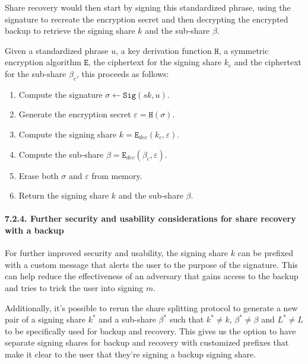 \documentclass[
]{article}
\providecommand{\tightlist}{%
  \setlength{\itemsep}{0pt}\setlength{\parskip}{0pt}}
\begin{document}
Share recovery would then start by signing this standardized phrase,
using the signature to recreate the encryption secret and then
decrypting the encrypted backup to retrieve the signing share \(k\) and
the sub-share \(\beta\).

Given a standardized phrase \(u\), a key derivation function
\(\mathtt{H}\), a symmetric encryption algorithm \(\mathtt{E}\), the
ciphertext for the signing share \(k_c\) and the ciphertext for the
sub-share \(\beta _c\), this proceeds as follows:

\begin{enumerate}
\def\labelenumi{\arabic{enumi}.}
\tightlist
\item
  Compute the signature \(\sigma \leftarrow \mathtt{Sig}(sk, u)\).
\item
  Generate the encryption secret \(\varepsilon = \mathtt{H}(\sigma)\).
\item
  Compute the signing share \(k = \mathtt{E} _{dec}(k_c, \varepsilon)\).
\item
  Compute the sub-share
  \(\beta = \mathtt{E} _{dec}(\beta _c, \varepsilon)\).
\item
  Erase both \(\sigma\) and \(\varepsilon\) from memory.
\item
  Return the signing share \(k\) and the sub-share \(\beta\).
\end{enumerate}

\hypertarget{share-recovery-backup-enhancements}{%
\paragraph{7.2.4. Further security and usability considerations for
share recovery with a backup}\label{share-recovery-backup-enhancements}}

For further improved security and usability, the signing share \(k\) can
be prefixed with a custom message that alerts the user to the purpose of
the signature. This can help reduce the effectiveness of an adversary
that gains access to the backup and tries to trick the user into signing
\(m\).

Additionally, it's possible to rerun the share splitting protocol to
generate a new pair of a signing share \(k^ \ast\) and a sub-share
\(\beta ^ \ast\) such that \(k^ \ast \neq k\),
\(\beta ^ \ast \neq \beta\) and \(L^ \ast \neq L\) to be specifically
used for backup and recovery. This gives us the option to have separate
signing shares for backup and recovery with customized prefixes that
make it clear to the user that they're signing a backup signing share.
\end{document}
